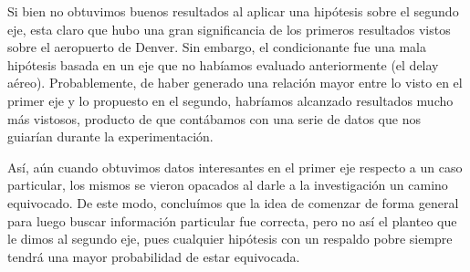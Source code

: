 Si bien no obtuvimos buenos resultados al aplicar una hipótesis sobre el segundo eje, esta claro que
hubo una gran significancia de los primeros resultados vistos sobre el aeropuerto de Denver.
Sin
embargo, el condicionante fue una mala hipótesis basada en un eje que no habíamos evaluado
anteriormente (el delay aéreo). Probablemente, de haber generado una relación mayor entre lo
visto en el primer eje y lo propuesto en el segundo, habríamos alcanzado resultados mucho más vistosos,
producto de que contábamos con una serie de datos que nos guiarían durante la experimentación.

Así, aún cuando obtuvimos datos interesantes en el primer eje respecto a un caso particular,
los
mismos se vieron opacados al darle a la investigación un camino equivocado. De este modo, concluímos
que la idea de comenzar de forma general para luego buscar información particular fue correcta, pero
no así el planteo que le dimos al segundo eje, pues cualquier hipótesis con un respaldo pobre siempre
tendrá una mayor probabilidad de estar equivocada.

\fi